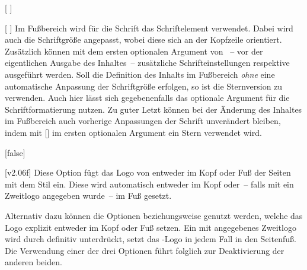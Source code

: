 \begin{Declaration*}{}
\begin{Declaration*}{}
\begin{Declaration*}{}
\begin{Declaration}{%
  [%
  ]%
}
\begin{Declaration}[v2.04]{%
  [%
  ]%
}
Im Fußbereich wird für die Schrift das Schriftelement  
verwendet. Dabei wird auch die Schriftgröße angepasst, wobei diese sich an der 
Kopfzeile orientiert. Zusätzlich können mit dem ersten optionalen Argument von 
~-- vor der eigentlichen Ausgabe des Inhaltes~-- zusätzliche 
Schrifteinstellungen respektive  ausgeführt werden. Soll die 
Definition des Inhalts im Fußbereich \emph{ohne} eine automatische Anpassung 
der Schriftgröße erfolgen, so ist die Sternversion  zu 
verwenden. Auch hier lässt sich gegebenenfalls das optionale Argument für die 
Schriftformatierung nutzen.
Zu guter Letzt können bei der Änderung des Inhaltes im Fußbereich auch 
vorherige Anpassungen der Schrift unverändert bleiben, indem mit
[\POParameter{*}]
im ersten optionalen Argument ein Stern verwendet wird. 
\end{Declaration}
\end{Declaration}

\begin{Declaration}[%
  v2.02:Logo von \DDC automatisch in Kopf/Fuß;%
  v2.02!\Option{ddc=colorblack};
  v2.02!\Option{ddc=gray};
  v2.02!\Option{ddc=black};
  v2.02!\Option{ddc=blue};
  v2.02!\Option{ddc=white};
]{}[false]
\begin{Declaration}[v2.02]{}
\begin{Declaration}[v2.02]{}
\printdeclarationlist%
%
%
%
%
[v2.06f]
%
Diese Option fügt das Logo von \DDC entweder im Kopf oder Fuß der Seiten mit 
dem Stil  ein. Diese wird automatisch entweder im Kopf 
oder~-- falls mit  ein Zweitlogo angegeben wurde~-- im Fuß 
gesetzt.

Alternativ dazu können die Optionen  beziehungsweise 
 genutzt werden, welche das Logo explizit entweder im Kopf oder 
Fuß setzen. Ein mit  angegebenes Zweitlogo wird durch 
 definitiv unterdrückt,  setzt das 
\DDC-Logo in jedem Fall in den Seitenfuß. Die Verwendung einer der drei 
Optionen führt folglich zur Deaktivierung der anderen beiden.


\end{Declaration}
\end{Declaration}
\end{Declaration}
\end{Declaration*}
\end{Declaration*}
\end{Declaration*}
